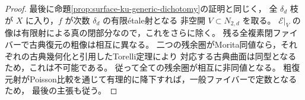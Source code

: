 \begin{proof}
最後に命題\ref{prop:surface-ku-generic-dichotomy}の証明と同じく，
全 $\delta_d$ 枝が $X$ に入り，$f$ が次数 $\delta_d$ の有限\'{e}tale射となる
非空開 $V\subset N_{2,d}$ を取る。
$\mathcal E|_V$ の像は有限射による真の閉部分なので，これをさらに除く。
残る全複素閉ファイバーで古典復元の粗像は相互に異なる。
二つの残余圏がMorita同値なら，それぞれの古典幾何化と引用したTorelli定理により
対応する古典曲面は同型となるため，これは不可能である。
従って全ての残余圏が相互に非同値となる。
粗復元射がPoisson比較を通じて有理的に降下すれば，一般ファイバーで定数となるため，
最後の主張も従う。
\end{proof}

